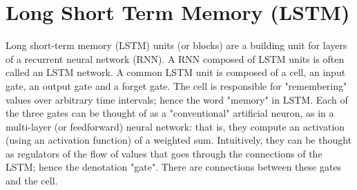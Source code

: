 \section{Long Short Term Memory (LSTM)}

Long short-term memory (LSTM) units (or blocks) are a building unit for layers of a recurrent neural network (RNN). A RNN composed of LSTM units is often called an LSTM network. A common LSTM unit is composed of a cell, an input gate, an output gate and a forget gate. The cell is responsible for "remembering" values over arbitrary time intervals; hence the word "memory" in LSTM. Each of the three gates can be thought of as a "conventional" artificial neuron, as in a multi-layer (or feedforward) neural network: that is, they compute an activation (using an activation function) of a weighted sum. Intuitively, they can be thought as regulators of the flow of values that goes through the connections of the LSTM; hence the denotation "gate". There are connections between these gates and the cell.
